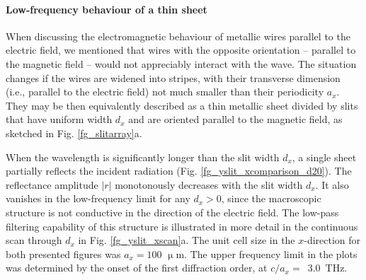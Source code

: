\paragraph{Low-frequency behaviour of a thin sheet}%
When discussing the electromagnetic behaviour of metallic wires parallel to the electric field, we mentioned that wires with the opposite orientation -- parallel to the magnetic field -- would not appreciably interact with the wave. The situation changes if the wires are widened into stripes, with their transverse dimension (i.e., parallel to the electric field) not much smaller than their periodicity $a_x$. They may be then equivalently described as a thin metallic sheet divided by slits that have uniform width $d_x$ and are oriented parallel to the magnetic field, as sketched in Fig. \ref{fg_slitarray}a.

When the wavelength is significantly longer than the slit width $d_x$, a single sheet partially reflects the incident radiation (Fig. \ref{fg_yslit_xcomparison_d20}). The reflectance amplitude $|r|$ mono\-to\-nously decreases with the slit width $d_x$.  It also vanishes in the low-frequency limit for any $d_x>0$, since the macroscopic structure is not conductive in the direction of the electric field.  The low-pass filtering capability of this structure is illustrated in more detail in the continuous scan through $d_x$ in Fig. \ref{fg_yslit_xscan}a. 
The unit cell size in the $x$-direction for both presented figures was $a_x = 100$ $\upmu$m. 
The upper frequency limit in the plots was determined by the onset of the first diffraction order, at $c/a_x =$~3.0~THz. 

